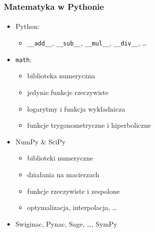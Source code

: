 \documentclass[10pt]{beamer}
\begin{document}
\begin{frame}[fragile]
    \frametitle{Matematyka w Pythonie}
    \framesubtitle{}

    \begin{itemize}
        \item Python:
            \begin{itemize}
                \item \verb+__add__+, \verb+__sub__+, \verb+__mul__+, \verb+__div__+, \ldots
            \end{itemize}
        \pause
        \item \texttt{math}:
            \begin{itemize}
                \item biblioteka numeryczna
                \item jedynie funkcje rzeczywiste
                \item logarytmy i funkcja wykładnicza
                \item funkcje trygonometryczne i hiperboliczne
            \end{itemize}
        \pause
        \item NumPy \& SciPy
            \begin{itemize}
                \item biblioteki numeryczne
                \item działania na macierzach
                \item funkcje rzeczywiste i zespolone
                \item optymalizacja, interpolacja, \ldots
            \end{itemize}
        \pause
        \item Swiginac, Pynac, Sage, \ldots, SymPy
    \end{itemize}
\end{frame}
\end{document}
